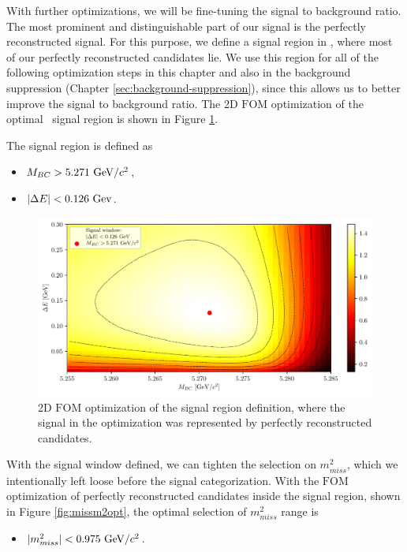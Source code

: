With further optimizations, we will be fine-tuning the signal to background ratio. The most prominent and distinguishable part of our signal is the perfectly reconstructed signal. For this purpose, we define a signal region in \vars, where most of our perfectly reconstructed candidates lie. We use this region for all of the following optimization steps in this chapter and also in the background suppression (Chapter \ref{sec:background-suppression}), since this allows us to better improve the signal to background ratio. The 2D $\mathrm{FOM}$ optimization of the optimal \vars~signal region is shown in Figure \ref{fig:sigwin}.

The signal region is defined as
\begin{itemize}
	\item $M_{BC} > 5.271\mathrm{~GeV}/c^2$,
	\item $\vert \Delta E \vert < 0.126\mathrm{~Gev}$. 
\end{itemize}

\begin{figure}[H]
	\centering
	\captionsetup{width=0.8\linewidth}
	\includegraphics[width=\linewidth]{fig/sigWin}
	\caption{2D $\mathrm{FOM}$ optimization of the signal region definition, where the signal in the optimization was represented by perfectly reconstructed candidates.}
	\label{fig:sigwin}
\end{figure}

With the signal window defined, we can tighten the selection on $m_{miss}^2$, which we intentionally left loose before the signal categorization. With the $\mathrm{FOM}$ optimization of perfectly reconstructed candidates inside the signal region, shown in Figure \ref{fig:missm2opt}, the optimal selection of $m_{miss}^2$ range is 

\begin{itemize}
	\item $\vert m_{miss}^2 \vert < 0.975\mathrm{~GeV}/c^2$.
\end{itemize}

